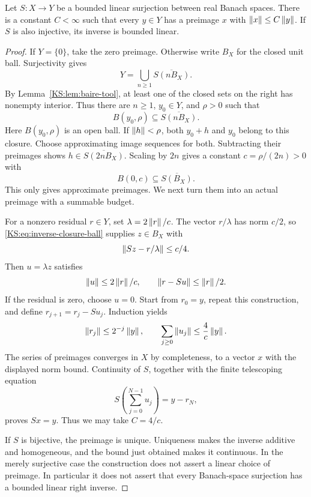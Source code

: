 \documentclass[11pt,oneside,openany]{book}
\numberwithin{equation}{section}
\begin{document}
\begin{KSlemma}\label{KS:lem:inverse-tool}
Let \(S:X\to Y\) be a bounded linear surjection between real Banach spaces. There is a constant \(C<\infty\) such that every \(y\in Y\) has a preimage \(x\) with \(\left\lVert x\right\rVert\le C\left\lVert y\right\rVert\). If \(S\) is also injective, its inverse is bounded linear.
\end{KSlemma}
\begin{proof}
If \(Y=\{0\}\), take the zero preimage. Otherwise write \(B_X\) for the closed unit ball. Surjectivity gives
\[
 Y=\bigcup_{n\ge1}\overline{S(nB_X)}.
\]
By Lemma~\ref{KS:lem:baire-tool}, at least one of the closed sets on the right has nonempty interior. Thus there are \(n\ge1\), \(y_0\in Y\), and \(\rho>0\) such that
\[
 B(y_0,\rho)\subseteq\overline{S(nB_X)}.
\]
Here \(B(y_0,\rho)\) is an open ball. If \(\left\lVert h\right\rVert<\rho\), both \(y_0+h\) and \(y_0\) belong to this closure. Choose approximating image sequences for both. Subtracting their preimages shows \(h\in\overline{S(2nB_X)}\). Scaling by \(2n\) gives a constant \(c=\rho/(2n)>0\) with
\begin{equation}\label{KS:eq:inverse-closure-ball}
 B(0,c)\subseteq\overline{S(B_X)}.
\end{equation}
This only gives approximate preimages. We next turn them into an actual preimage with a summable budget.

For a nonzero residual \(r\in Y\), set \(\lambda=2\left\lVert r\right\rVert/c\). The vector \(r/\lambda\) has norm \(c/2\), so \eqref{KS:eq:inverse-closure-ball} supplies \(z\in B_X\) with
\[
 \left\lVert Sz-r/\lambda\right\rVert\le c/4.
\]
Then \(u=\lambda z\) satisfies
\[
 \left\lVert u\right\rVert\le 2\left\lVert r\right\rVert/c,\qquad
 \left\lVert r-Su\right\rVert\le\left\lVert r\right\rVert/2.
\]
If the residual is zero, choose \(u=0\). Start from \(r_0=y\), repeat this construction, and define \(r_{j+1}=r_j-Su_j\). Induction yields
\[
 \left\lVert r_j\right\rVert\le2^{-j}\left\lVert y\right\rVert,\qquad
 \sum_{j\ge0}\left\lVert u_j\right\rVert\le\frac{4}{c}\left\lVert y\right\rVert.
\]
The series of preimages converges in \(X\) by completeness, to a vector \(x\) with the displayed norm bound. Continuity of \(S\), together with the finite telescoping equation
\[
 S\left(\sum_{j=0}^{N-1}u_j\right)=y-r_N,
\]
proves \(Sx=y\). Thus we may take \(C=4/c\).

If \(S\) is bijective, the preimage is unique. Uniqueness makes the inverse additive and homogeneous, and the bound just obtained makes it continuous. In the merely surjective case the construction does not assert a linear choice of preimage. In particular it does not assert that every Banach-space surjection has a bounded linear right inverse.
\end{proof}
\end{document}
